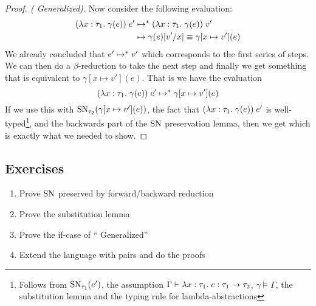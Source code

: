 \begin{proof}[Proof. ( Generalized)]
Now consider the following evaluation:
\begin{align*}
  (\lambda x : \tau_1 . \; \gamma(e)) \; e' & \mapsto^{*} (\lambda x : \tau_1 . \; \gamma(e)) \; v' \\
                                       & \mapsto \gamma(e)[v'/x] \equiv 
                                                   \gamma[x \mapsto v'](e)
\end{align*}
We already concluded that $e' \mapsto^{*} v'$ which corresponds to the first series of steps. We can then do a $\beta$-reduction to take the next step and finally we get something that is equivalent to $\gamma[x \mapsto v'](e)$. That is we have the evaluation
\[
(\lambda x : \tau_1 . \; \gamma(e)) \; e' \mapsto^{*} \gamma[x \mapsto v'](e)
\]
If we use this with $\operatorname{SN}_{\tau_2}(\gamma[x\mapsto v'](e))$, the fact that $(\lambda x : \tau_1 . \; \gamma(e)) \; e'$ is well-typed\footnote{Follows from $\operatorname{SN}_{\tau_1}(e')$, the assumption $\Gamma \vdash \lambda x : \tau_1 . \; e :  \tau_1 \rightarrow \tau_2$, $\gamma \models \Gamma$, the substitution lemma and the typing rule for lambda-abstractions}, and the backwards part of the $\operatorname{SN}$ preservation lemma, then we get  which is exactly what we needed to show.


\end{proof}
\subsection*{Exercises}
\begin{enumerate}
\item Prove $\operatorname{SN}$ preserved by forward/backward reduction
\item Prove the substitution lemma
\item Prove the if-case of `` Generalized''
\item Extend the language with pairs and do the proofs
\end{enumerate}
\clearpage
